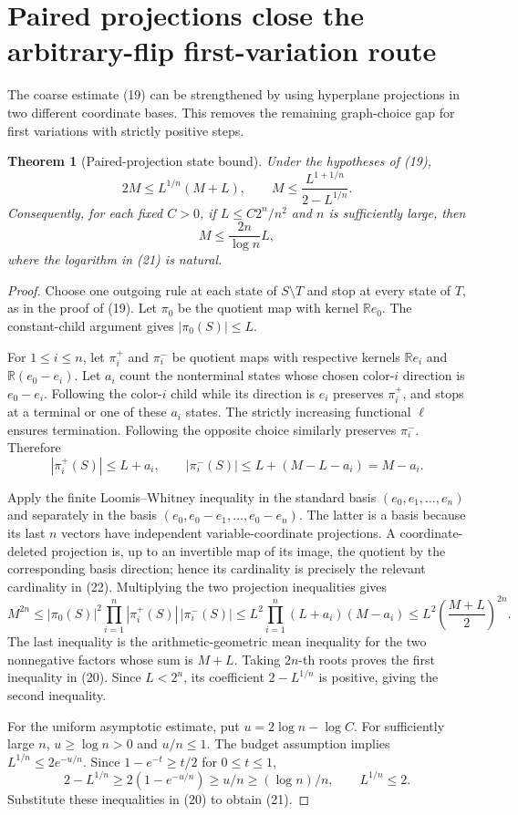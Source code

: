 \documentclass[11pt]{article}
\newtheorem{theorem}{Theorem}
\begin{document}
\section{Paired projections close the arbitrary-flip first-variation route}

The coarse estimate (19) can be strengthened by using hyperplane
projections in two different coordinate bases. This removes the remaining
graph-choice gap for first variations with strictly positive steps.

\begin{theorem}[Paired-projection state bound]
Under the hypotheses of (19),
\[
             2M\le L^{1/n}(M+L),\qquad
             M\le\frac{L^{1+1/n}}{2-L^{1/n}}. \tag{20}
\]
Consequently, for each fixed $C>0$, if $L\le C2^n/n^2$ and $n$
is sufficiently large, then
\[
                       M\le \frac{2n}{\log n}L, \tag{21}
\]
where the logarithm in (21) is natural.
\end{theorem}
\begin{proof}
Choose one outgoing rule at each state of $S\setminus T$ and stop
at every state of $T$, as in the proof of (19). Let $\pi_0$ be the
quotient map with kernel $\mathbb R e_0$. The constant-child argument
gives $|\pi_0(S)|\le L$.

For $1\le i\le n$, let $\pi_i^+$ and $\pi_i^-$ be quotient maps
with respective kernels $\mathbb R e_i$ and
$\mathbb R(e_0-e_i)$. Let $a_i$ count the nonterminal states whose
chosen color-$i$ direction is $e_0-e_i$. Following the color-$i$
child while its direction is $e_i$ preserves $\pi_i^+$, and stops
at a terminal or one of these $a_i$ states. The strictly increasing
functional $\ell$ ensures termination. Following the opposite choice
similarly preserves $\pi_i^-$. Therefore
\[
       |\pi_i^+(S)|\le L+a_i,\qquad
       |\pi_i^-(S)|\le L+(M-L-a_i)=M-a_i. \tag{22}
\]

Apply the finite Loomis--Whitney inequality in the standard basis
$(e_0,e_1,\ldots,e_n)$ and separately in the basis
$(e_0,e_0-e_1,\ldots,e_0-e_n)$. The latter is a basis because its
last $n$ vectors have independent variable-coordinate projections.
A coordinate-deleted projection is, up to an invertible map of its
image, the quotient by the corresponding basis direction; hence its
cardinality is precisely the relevant cardinality in (22). Multiplying
the two projection inequalities gives
\[
 M^{2n}\le |\pi_0(S)|^2
             \prod_{i=1}^n|\pi_i^+(S)|\,|\pi_i^-(S)|
       \le L^2\prod_{i=1}^n(L+a_i)(M-a_i)
       \le L^2\left(\frac{M+L}{2}\right)^{2n}. \tag{23}
\]
The last inequality is the arithmetic-geometric mean inequality for
the two nonnegative factors whose sum is $M+L$. Taking $2n$-th
roots proves the first inequality in (20). Since $L<2^n$, its
coefficient $2-L^{1/n}$ is positive, giving the second inequality.

For the uniform asymptotic estimate, put $u=2\log n-\log C$.
For sufficiently large $n$, $u\ge\log n>0$ and $u/n\le1$.
The budget assumption implies $L^{1/n}\le2e^{-u/n}$. Since
$1-e^{-t}\ge t/2$ for $0\le t\le1$,
\[
 2-L^{1/n}\ge 2(1-e^{-u/n})\ge u/n\ge(\log n)/n,
 \qquad L^{1/n}\le2.
\]
Substitute these inequalities in (20) to obtain (21).
\end{proof}
\end{document}
